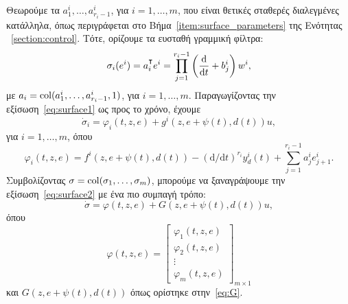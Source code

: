 Θεωρούμε τα $a^i_1, \ldots, a^i_{r_i-1}$, για $i = 1, \ldots, m$, που είναι θετικές σταθερές διαλεγμένες κατάλληλα, όπως περιγράφεται στο Βήμα~\ref{item:surface_parameters} της Ενότητας ~\ref{section:control}. Τότε, ορίζουμε τα ευσταθή γραμμική φίλτρα:
\begin{equation}
    \label{eq:surface1}
    \sigma_i(e^i) = a_i^\T e^i = \prod_{j=1}^{r_i-1}
    \left(\frac{\mathrm d}{\mathrm dt} + b_j^i \right) w^i,
\end{equation}
με $a_i = \operatorname{col}(a_1^i, \ldots, a_{r_i-1}^i, 1)$, για $i=1,\ldots,m$. Παραγωγίζοντας την εξίσωση~\eqref{eq:surface1} ως προς το χρόνο, έχουμε
\begin{equation}
    \label{eq:surface2}
    \dot \sigma_i = \varphi_i(t,z,e) + g^i(z,e + \psi(t),d(t))u,
\end{equation}
για $i = 1, \ldots, m$, όπου
\begin{equation*}
    \varphi_i(t,z,e) = f^i(z,e + \psi(t),d(t)) 
        - \left(\mathrm d/ \mathrm dt \right)^{r_i} y_d^i(t)
        + \sum_{j=1}^{r_i - 1} a_j^i e^i_{j+1}.
\end{equation*}
Συμβολίζοντας $\sigma = \operatorname{col}(\sigma_1, \ldots, \sigma_m)$, μπορούμε να ξαναγράψουμε την εξίσωση~\eqref{eq:surface2} με ένα πιο συμπαγή τρόπο:
\begin{equation}
\label{eq:surface3}
    \dot \sigma = \varphi(t,z,e) + G(z, e + \psi(t), d(t)) u,
\end{equation}
όπου
\[
    \varphi(t,z,e) = \begin{bmatrix}
    \varphi_1(t,z,e)\\ \varphi_2(t,z,e)\\
    \vdots \\ \varphi_m(t,z,e)
    \end{bmatrix}_{m \times 1}
\]
και $G(z, e + \psi(t), d(t))$ όπως ορίστηκε στην~\eqref{eq:G}.

